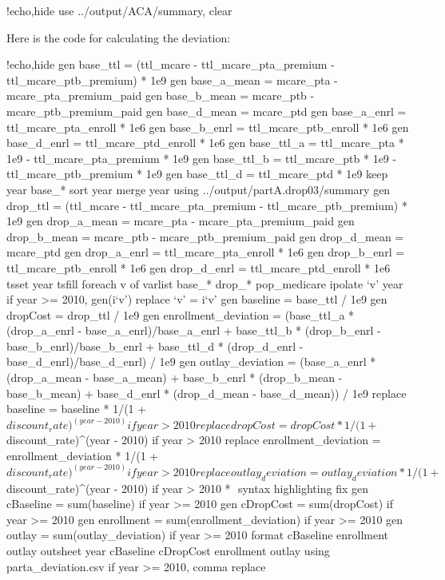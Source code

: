 \documentclass{article}
\begin{document}
\begin{Statacode}{!echo,hide}
use ../output/ACA/summary, clear
\end{Statacode}
Here is the code for calculating the deviation:
\begin{Statacode}{!echo,hide}
gen base_ttl = (ttl_mcare - ttl_mcare_pta_premium - ttl_mcare_ptb_premium) * 1e9
gen base_a_mean = mcare_pta - mcare_pta_premium_paid
gen base_b_mean = mcare_ptb - mcare_ptb_premium_paid
gen base_d_mean = mcare_ptd
gen base_a_enrl = ttl_mcare_pta_enroll * 1e6
gen base_b_enrl = ttl_mcare_ptb_enroll * 1e6
gen base_d_enrl = ttl_mcare_ptd_enroll * 1e6
gen base_ttl_a = ttl_mcare_pta * 1e9 - ttl_mcare_pta_premium * 1e9
gen base_ttl_b = ttl_mcare_ptb * 1e9 - ttl_mcare_ptb_premium * 1e9
gen base_ttl_d = ttl_mcare_ptd * 1e9
keep year base_*
sort year
merge year using ../output/partA.drop03/summary
gen drop_ttl = (ttl_mcare - ttl_mcare_pta_premium - ttl_mcare_ptb_premium) * 1e9
gen drop_a_mean = mcare_pta - mcare_pta_premium_paid
gen drop_b_mean = mcare_ptb - mcare_ptb_premium_paid
gen drop_d_mean = mcare_ptd
gen drop_a_enrl = ttl_mcare_pta_enroll * 1e6
gen drop_b_enrl = ttl_mcare_ptb_enroll * 1e6
gen drop_d_enrl = ttl_mcare_ptd_enroll * 1e6
tsset year
tsfill
foreach v of varlist base_* drop_* pop_medicare {
  ipolate `v' year if year >= 2010, gen(i`v')
  replace `v' = i`v'
}
gen baseline = base_ttl / 1e9
gen dropCost = drop_ttl / 1e9
gen enrollment_deviation = (base_ttl_a * (drop_a_enrl - base_a_enrl)/base_a_enrl + base_ttl_b * (drop_b_enrl - base_b_enrl)/base_b_enrl + base_ttl_d * (drop_d_enrl - base_d_enrl)/base_d_enrl) / 1e9
gen outlay_deviation = (base_a_enrl * (drop_a_mean - base_a_mean) + base_b_enrl * (drop_b_mean - base_b_mean) + base_d_enrl * (drop_d_mean - base_d_mean)) / 1e9
replace baseline = baseline * 1/(1 + $discount_rate)^(year - 2010) if year > 2010
replace dropCost = dropCost * 1/(1 + $discount_rate)^(year - 2010) if year > 2010
replace enrollment_deviation = enrollment_deviation * 1/(1 + $discount_rate)^(year - 2010) if year > 2010
replace outlay_deviation = outlay_deviation * 1/(1 + $discount_rate)^(year - 2010) if year > 2010
* $$ syntax highlighting fix
gen cBaseline = sum(baseline) if year >= 2010
gen cDropCost = sum(dropCost) if year >= 2010
gen enrollment = sum(enrollment_deviation) if year >= 2010
gen outlay = sum(outlay_deviation) if year >= 2010
format cBaseline enrollment outlay %
outsheet year cBaseline cDropCost enrollment outlay using parta_deviation.csv if year >= 2010, comma replace
\end{Statacode}
\end{document}
